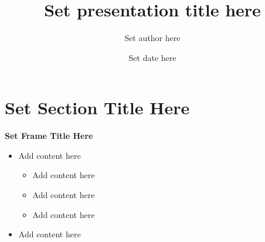 \documentclass[english]{beamer}
\title{Set presentation title here}
\author{Set author here}
\date{Set date here}
\makeatletter
\let\origtableofcontents=\tableofcontents
\def\tableofcontents{\@ifnextchar[{\origtableofcontents}{\gobbletableofcontents}}
\def\gobbletableofcontents#1{\origtableofcontents}
\makeatother
\begin{document}
{      \begin{frame}     \titlepage   \end{frame} }




\section{Set Section Title Here}
\begin{frame}{\textbf{Set Frame Title Here}}

\begin{itemize}
\item Add content here
\begin{itemize}
\item Add content here
\item Add content here
\item Add content here
\end{itemize}
\item Add content here
\end{itemize}
\end{frame}
\end{document}
